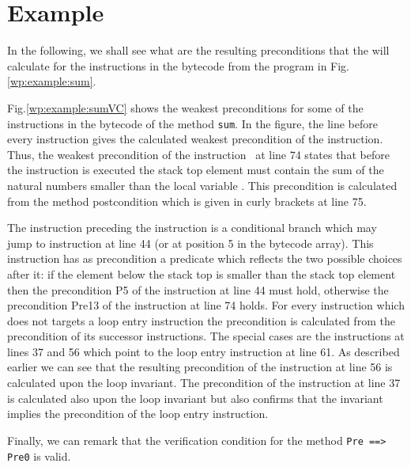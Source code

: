 \section{Example}\label{wp:example}
In the following, we  shall see what are the resulting preconditions 
that the \fwpi{} will calculate for the instructions in the bytecode from the program in Fig. \ref{wp:example:sum}.



Fig.\ref{wp:example:sumVC} shows the weakest preconditions for some of the instructions in the bytecode of the method  \lstinline!sum!.
In the figure, the line before every instruction gives the calculated weakest precondition of the instruction.
 Thus, the weakest precondition of the instruction  \return \ at line 74 states that before the instruction is executed the stack top element
\stack{\counter}  must  contain the sum  of the natural numbers smaller than the local variable . This precondition is calculated from the method postcondition 
which is given in curly brackets at line 75.



The instruction preceding the \return{}
instruction is a conditional branch which may jump to instruction at line 44 (or at position 5 in the bytecode array). 
This instruction has as precondition a predicate which reflects the two possible choices after it: if the element below
the stack top  is smaller than the stack top element \stack{\counter} then the precondition P5 of
the instruction at line 44 must hold, otherwise the precondition Pre13 of the instruction at line 74 holds. 
For every instruction which does not targets a loop entry instruction the precondition is calculated from the precondition of its
 successor instructions. The special cases are the instructions at lines 37 and 56 which point to the loop entry instruction
 at line 61. As described earlier we can see that the resulting precondition of the instruction at line 56 is calculated upon the loop invariant.
The precondition of the instruction at line 37 is calculated also upon the loop invariant but also confirms that the invariant implies
the precondition of the loop entry instruction.

Finally, we can remark that the  verification condition for the method \lstinline!Pre ==> Pre0! is valid.






